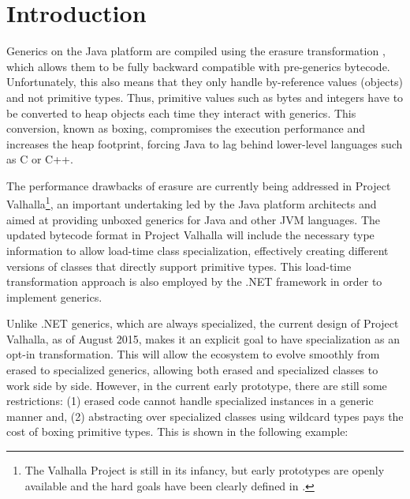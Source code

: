 \section{Introduction}
\label{sec:intro}

Generics on the Java platform are compiled using the erasure transformation \cite{java-erasure}, which allows them to be fully backward compatible with pre-generics bytecode. Unfortunately, this also means that they only handle by-reference values (objects) and not primitive types. Thus, primitive values such as bytes and integers have to be converted to heap objects each time they interact with generics. This conversion, known as boxing, compromises the execution performance and increases the heap footprint, forcing Java to lag behind lower-level languages such as C or C++.

The performance drawbacks of erasure are currently being addressed in Project Valhalla\footnote{The Valhalla Project is still in its infancy, but early prototypes are openly available and the hard goals have been clearly defined in \cite{goetz-specialization, rose-value-classes-tearing, rose-value-classes-vm}.\vspace{-0.5em}}, an important undertaking led by the Java platform architects and aimed at providing unboxed generics for Java and other JVM languages. The updated bytecode format in Project Valhalla will include the necessary type information to allow load-time class specialization, effectively creating different versions of classes that directly support primitive types. This load-time transformation approach is also employed by the .NET framework \cite{dot-net-generics,dot-net-generics-form} in order to implement generics.

Unlike .NET generics, which are always specialized, the current design of Project Valhalla, as of August 2015, makes it an explicit goal to have specialization as an opt-in transformation. This will allow the ecosystem to evolve smoothly from erased to specialized generics, allowing both erased and specialized classes to work side by side. However, in the current early prototype, there are still some restrictions: (1) erased code cannot handle specialized instances in a generic manner and, (2) abstracting over specialized classes using wildcard types \cite{valhalla-model2-announcement,valhalla-model2-implementation} pays the cost of boxing primitive types. This is shown in the following example:

